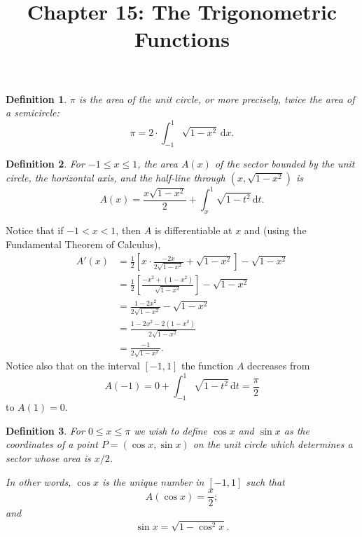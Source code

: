 \documentclass{article}
\newtheorem{definition}{Definition}
\begin{document}
\title{Chapter 15: The Trigonometric Functions}
\maketitle

\begin{definition}
  $\pi$ is the area of the unit circle, or more precisely, twice the area of a
  semicircle: \begin{equation*}
    \pi = 2 \cdot \int_{-1}^1 \sqrt{1 - x^2} \,\mathrm{d}x.
  \end{equation*}
\end{definition}

\begin{definition}
  For $-1 \leq x \leq 1$, the area $A(x)$ of the sector bounded by the unit
  circle, the horizontal axis, and the half-line through $(x, \sqrt{1 - x^2})$
  is \begin{equation*}
    A(x) = \frac{x\sqrt{1 - x^2}}{2} + \int_x^1 \sqrt{1 - t^2} \,\mathrm{d}t.
  \end{equation*}
\end{definition}

Notice that if $-1 < x < 1$, then $A$ is differentiable at $x$ and (using the
Fundamental Theorem of Calculus), \begin{align*}
  A'(x)
    &= \frac{1}{2}\left[x \cdot \frac{-2x}{2\sqrt{1 - x^2}}
    + \sqrt{1 - x^2}\right] - \sqrt{1 - x^2} \\
    &= \frac{1}{2}\left[\frac{-x^2 + (1 - x^2)}{\sqrt{1 - x^2}}\right] -
    \sqrt{1 - x^2} \\
    &= \frac{1 - 2x^2}{2\sqrt{1 - x^2}} - \sqrt{1 - x^2} \\
    &= \frac{1 - 2x^2 - 2(1 - x^2)}{2\sqrt{1 - x^2}} \\
    &= \frac{-1}{2\sqrt{1 - x^2}}.
\end{align*} Notice also that on the interval $[-1, 1]$ the function $A$
decreases from \begin{equation*}
  A(-1) = 0 + \int_{-1}^1 \sqrt{1 - t^2} \,\mathrm{d}t = \frac{\pi}{2}
\end{equation*} to $A(1) = 0$.

\begin{definition}
  For $0 \leq x \leq \pi$ we wish to define $\cos x$ and $\sin x$ as the
  coordinates of a point $P = (\cos x, \sin x)$ on the unit circle which
  determines a sector whose area is $x/2$.

  In other words, $\cos x$ is the unique number in $[-1, 1]$ such that
  \begin{equation*}
    A(\cos x) = \frac{x}{2};
  \end{equation*} and \begin{equation*}
    \sin x = \sqrt{1 - \cos^2 x}.
  \end{equation*}
\end{definition}
\end{document}
